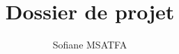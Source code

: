 \title{Dossier de projet}%
\author{Sofiane MSATFA} %

\newcommand{\titre}{Dossier de projet professionnel}
\newcommand{\formation}{Titre professionnel développeur web\\ et web mobile (DWWM)}
\newcommand{\auteur}{Sofiane MSATFA}
\newcommand{\session}{2021-2022}


\newcommand{\colored}[1]{{\color{red!55!orange}#1}}